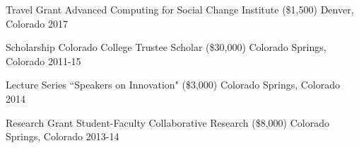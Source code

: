 
\begin{cvhonors}

  \cvhonor
    {Travel Grant} %
    {Advanced Computing for Social Change Institute (\$1,500)} 
    {Denver, Colorado}
    {2017}

  \cvhonor
    {Scholarship}
    {Colorado College Trustee Scholar (\$30,000)}
    {Colorado Springs, Colorado}
    {2011-15}

  \cvhonor
    {Lecture Series}
    {``Speakers on Innovation" (\$3,000)}
    {Colorado Springs, Colorado}
    {2014}

  \cvhonor
    {Research Grant}
    {Student-Faculty Collaborative Research (\$8,000)}
    {Colorado Springs, Colorado}
    {2013-14}
    
\end{cvhonors}
